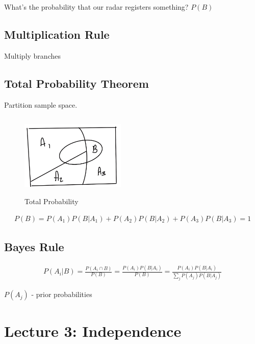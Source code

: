 \documentclass{article}
\begin{document}

What's the probability that our radar registers something? $P(B)$

\subsection{Multiplication Rule}


Multiply branches


\subsection{Total Probability Theorem}

Partition sample space.

\begin{figure}[ht]
\centering
\includegraphics[width=5cm, height=4cm]{images/L02/total_prob.jpeg}
\caption{Total Probability}
\end{figure}

\begin{align*}
P(B)=P(A_1)P(B|A_1) + P(A_2)P(B|A_2) + P(A_3)P(B|A_3) = 1
\end{align*}

\subsection{Bayes Rule}

\begin{align*}
P(A_i|B) = \frac{P(A_i \cap B)}{P(B)} = \frac{P(A_i)P(B|A_i)}{P(B)} = \frac{P(A_i)P(B|A_i)}{\sum_j P(A_j)P(B|A_j)}
\end{align*}

$P(A_j)$ - prior probabilities

\section{Lecture 3: Independence}

\end{document}
